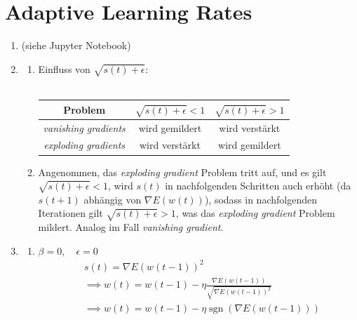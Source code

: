 \documentclass{article}
\DeclareMathOperator{\sgn}{sgn}
\begin{document}
\begin{enumerate}[label=\arabic*.]
\end{enumerate}

\section{Adaptive Learning Rates}
\begin{enumerate}
  \item (siehe Jupyter Notebook)
  \item
        \begin{enumerate}[label=\alph*)]
          \item Einfluss von $\sqrt{s(t) + \epsilon}$: \\\\
                \begin{tabular}{c|cc}
                  \toprule
                  Problem                      & $\displaystyle \sqrt{s(t) + \epsilon} < 1$ & $\sqrt{s(t) + \epsilon} > 1$ \\
                  \midrule
                  \textit{vanishing gradients} & wird gemildert                             & wird verstärkt               \\
                  \textit{exploding gradients} & wird verstärkt                             & wird gemildert               \\
                  \bottomrule
                \end{tabular}
          \item Angenommen, das \textit{exploding gradient} Problem tritt auf, und es gilt $\sqrt{s(t) + \epsilon} < 1$,
                wird $s(t)$ in nachfolgenden Schritten auch erhöht (da $s(t+1)$ abhängig von $\nabla E(w(t))$),
                sodass in nachfolgenden Iterationen gilt $\sqrt{s(t) + \epsilon} > 1$,
                was das \textit{exploding gradient} Problem mildert.
                Analog im Fall \textit{vanishing gradient}.
        \end{enumerate}
  \item
        \begin{enumerate}[label=\alph*)]
          \item $\beta = 0, \quad \epsilon = 0$
                \begin{align*}
                   & s(t) = \nabla E(w(t-1))^2                                                        \\
                   & \implies w(t) = w(t-1) - \eta \frac{\nabla E(w(t-1))}{\sqrt{\nabla E(w(t-1))^2}} \\
                   & \implies w(t) = w(t-1) - \eta \sgn(\nabla E(w(t-1)))

\end{align*}
\end{enumerate}
\end{enumerate}
\end{document}
